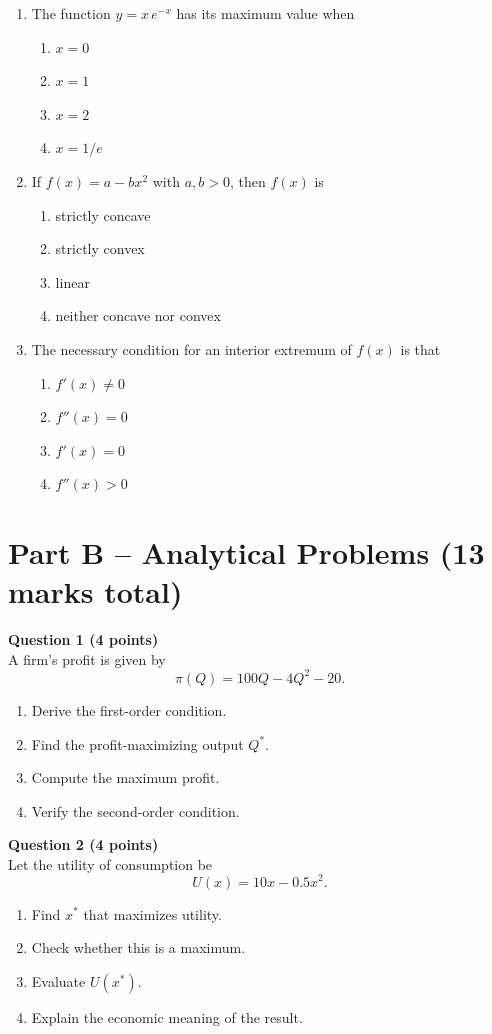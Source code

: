 \documentclass[12pt]{article}
\begin{document}
\begin{enumerate}
\item The function \(y=x\,e^{-x}\) has its maximum value when  
\begin{enumerate}
\item \(x=0\)  
\item \(x=1\)  
\item \(x=2\)  
\item \(x=1/e\)
\end{enumerate}

\item If \(f(x)=a-bx^2\) with \(a,b>0\), then \(f(x)\) is  
\begin{enumerate}
\item strictly concave  
\item strictly convex  
\item linear  
\item neither concave nor convex
\end{enumerate}

\item The necessary condition for an interior extremum of \(f(x)\) is that  
\begin{enumerate}
\item \(f'(x)\neq0\)  
\item \(f''(x)=0\)  
\item \(f'(x)=0\)  
\item \(f''(x)>0\)
\end{enumerate}
\end{enumerate}

\newpage

\section*{Part B – Analytical Problems (13 marks total)}

\textbf{Question 1 (4 points)}\\
A firm’s profit is given by  
\[
\pi(Q)=100Q-4Q^2-20.
\]
\begin{enumerate}
\item Derive the first-order condition.  
\item Find the profit-maximizing output \(Q^*\).  
\item Compute the maximum profit.  
\item Verify the second-order condition.
\end{enumerate}

\vspace{1em}

\textbf{Question 2 (4 points)}\\
Let the utility of consumption be  
\[
U(x)=10x-0.5x^2.
\]
\begin{enumerate}
\item Find \(x^*\) that maximizes utility.  
\item Check whether this is a maximum.  
\item Evaluate \(U(x^*)\).  
\item Explain the economic meaning of the result.
\end{enumerate}
\end{document}
